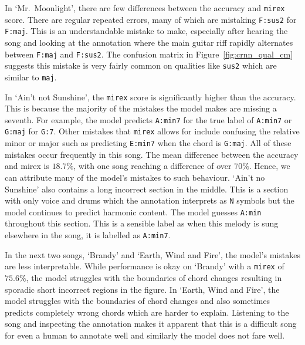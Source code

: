 In `Mr.\ Moonlight', there are few differences between the accuracy and \texttt{mirex} score. There are regular repeated errors, many of which are mistaking \texttt{F:sus2} for \texttt{F:maj}. This is an understandable mistake to make, especially after hearing the song and looking at the annotation where the main guitar riff rapidly alternates between \texttt{F:maj} and \texttt{F:sus2}. The confusion matrix in Figure~\ref{fig:crnn_qual_cm} suggests this mistake is very fairly common on qualities like \texttt{sus2} which are similar to \texttt{maj}. 

In `Ain't not Sunshine', the \texttt{mirex} score is significantly higher than the accuracy. This is because the majority of the mistakes the model makes are missing a seventh. For example, the model predicts \texttt{A:min7} for the true label of \texttt{A:min7} or \texttt{G:maj} for \texttt{G:7}. Other mistakes that \texttt{mirex} allows for include confusing the relative minor or major such as predicting \texttt{E:min7} when the chord is \texttt{G:maj}. All of these mistakes occur frequently in this song. The mean difference between the accuracy and mirex is $18.7\%$, with one song reaching a difference of over $70\%$. Hence, we can attribute many of the model's mistakes to such behaviour. `Ain't no Sunshine' also contains a long incorrect section in the middle. This is a section with only voice and drums which the annotation interprets as \texttt{N} symbols but the model continues to predict harmonic content. The model guesses \texttt{A:min} throughout this section. This is a sensible label as when this melody is sung elsewhere in the song, it is labelled as \texttt{A:min7}.

In the next two songs, `Brandy' and `Earth, Wind and Fire', the model's mistakes are less interpretable. While performance is okay on `Brandy' with a \texttt{mirex} of $75.6\%$, the model struggles with the boundaries of chord changes resulting in sporadic short incorrect regions in the figure. In `Earth, Wind and Fire', the model struggles with the boundaries of chord changes and also sometimes predicts completely wrong chords which are harder to explain. Listening to the song and inspecting the annotation makes it apparent that this is a difficult song for even a human to annotate well and similarly the model does not fare well.

